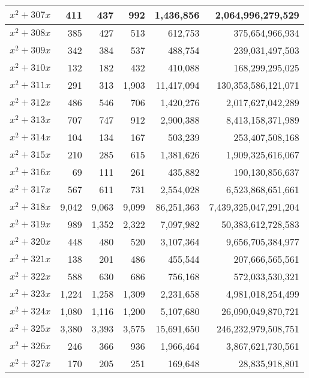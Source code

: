\documentclass[a4paper]{amsproc}
\theoremstyle{plain}
\begin{document}
\begin{longtable}{ | l | r | r | r | r | r | }
$x^2 + 307x$ & 411 & 437 & 992 & 1{,}436{,}856 & 2{,}064{,}996{,}279{,}529 \\ \hline
$x^2 + 308x$ & 385 & 427 & 513 & 612{,}753 & 375{,}654{,}966{,}934 \\ \hline
$x^2 + 309x$ & 342 & 384 & 537 & 488{,}754 & 239{,}031{,}497{,}503 \\ \hline
$x^2 + 310x$ & 132 & 182 & 432 & 410{,}088 & 168{,}299{,}295{,}025 \\ \hline
$x^2 + 311x$ & 291 & 313 & 1{,}903 & 11{,}417{,}094 & 130{,}353{,}586{,}121{,}071 \\ \hline
$x^2 + 312x$ & 486 & 546 & 706 & 1{,}420{,}276 & 2{,}017{,}627{,}042{,}289 \\ \hline
$x^2 + 313x$ & 707 & 747 & 912 & 2{,}900{,}388 & 8{,}413{,}158{,}371{,}989 \\ \hline
$x^2 + 314x$ & 104 & 134 & 167 & 503{,}239 & 253{,}407{,}508{,}168 \\ \hline
$x^2 + 315x$ & 210 & 285 & 615 & 1{,}381{,}626 & 1{,}909{,}325{,}616{,}067 \\ \hline
$x^2 + 316x$ & 69 & 111 & 261 & 435{,}882 & 190{,}130{,}856{,}637 \\ \hline
$x^2 + 317x$ & 567 & 611 & 731 & 2{,}554{,}028 & 6{,}523{,}868{,}651{,}661 \\ \hline
$x^2 + 318x$ & 9{,}042 & 9{,}063 & 9{,}099 & 86{,}251{,}363 & 7{,}439{,}325{,}047{,}291{,}204 \\ \hline
$x^2 + 319x$ & 989 & 1{,}352 & 2{,}322 & 7{,}097{,}982 & 50{,}383{,}612{,}728{,}583 \\ \hline
$x^2 + 320x$ & 448 & 480 & 520 & 3{,}107{,}364 & 9{,}656{,}705{,}384{,}977 \\ \hline
$x^2 + 321x$ & 138 & 201 & 486 & 455{,}544 & 207{,}666{,}565{,}561 \\ \hline
$x^2 + 322x$ & 588 & 630 & 686 & 756{,}168 & 572{,}033{,}530{,}321 \\ \hline
$x^2 + 323x$ & 1{,}224 & 1{,}258 & 1{,}309 & 2{,}231{,}658 & 4{,}981{,}018{,}254{,}499 \\ \hline
$x^2 + 324x$ & 1{,}080 & 1{,}116 & 1{,}200 & 5{,}107{,}680 & 26{,}090{,}049{,}870{,}721 \\ \hline
$x^2 + 325x$ & 3{,}380 & 3{,}393 & 3{,}575 & 15{,}691{,}650 & 246{,}232{,}979{,}508{,}751 \\ \hline
$x^2 + 326x$ & 246 & 366 & 936 & 1{,}966{,}464 & 3{,}867{,}621{,}730{,}561 \\ \hline
$x^2 + 327x$ & 170 & 205 & 251 & 169{,}648 & 28{,}835{,}918{,}801 \\ \hline

\end{longtable}
\end{document}
